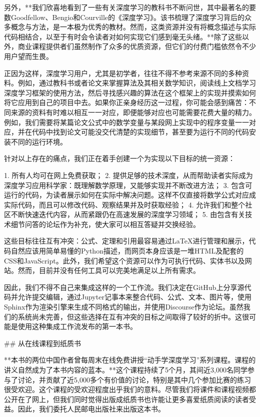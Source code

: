 另外，**我们欣喜地看到了一些有关深度学习的教科书不断问世，其中最著名的要数Goodfellow、Bengio和Courville的《深度学习》。该书梳理了深度学习背后的众多概念与方法，是一本极为优秀的教材。然而，这类资源并没有将概念描述与实际代码相结合，以至于有时会令读者对如何实现它们感到毫无头绪。**除了这些以外，商业课程提供者们虽然制作了众多的优质资源，但它们的付费门槛依然令不少用户望而生畏。

正因为这样，深度学习用户，尤其是初学者，往往不得不参考来源不同的多种资料。例如，通过教科书或者论文来掌握算法及其相关数学知识，阅读线上文档学习深度学习框架的使用方法，然后寻找感兴趣的算法在这个框架上的实现并摸索如何将它应用到自己的项目中去。如果你正亲身经历这一过程，你可能会感到痛苦：不同来源的资料有时难以相互一一对应，即便能够对应也可能需要花费大量的精力。例如，我们需要将某篇论文公式中的数学变量与某段网上实现中的程序变量一一对应，并在代码中找到论文可能没交代清楚的实现细节，甚至要为运行不同的代码安装不同的运行环境。

针对以上存在的痛点，我们正在着手创建一个为实现以下目标的统一资源：

1. 所有人均可在网上免费获取；
2. 提供足够的技术深度，从而帮助读者实际成为深度学习应用科学家：既理解数学原理，又能够实现并不断改进方法；
3. 包含可运行的代码，为读者展示如何在实际中解决问题。这样不仅直接将数学公式对应成实际代码，而且可以修改代码、观察结果并及时获取经验；
4. 允许我们和整个社区不断快速迭代内容，从而紧跟仍在高速发展的深度学习领域；
5. 由包含有关技术细节问答的论坛作为补充，使大家可以相互答疑并交换经验。

这些目标往往互有冲突：公式、定理和引用最容易通过LaTeX进行管理和展示，代码自然应该用简单易懂的Python描述，而网页本身应该是一堆HTML及配套的CSS和JavaScript。此外，我们希望这个资源可以作为可执行代码、实体书以及网站。然而，目前并没有任何工具可以完美地满足以上所有需求。

因此，我们不得不自己来集成这样的一个工作流。我们决定在GitHub上分享源代码并允许提交编辑，通过Jupyter记事本来整合代码、公式、文本、图片等，使用Sphinx作为渲染引擎来生成不同格式的输出，并使用Discourse作为论坛。虽然我们的系统尚未完善，但这些选择在互有冲突的目标之间取得了较好的折中。这很可能是使用这种集成工作流发布的第一本书。

## 从在线课程到纸质书

**本书的两位中国作者曾每周末在线免费讲授“动手学深度学习”系列课程。课程的讲义自然成为了本书内容的蓝本。**这个课程持续了5个月，其间近3,000名同学参与了讨论，并贡献了近5,000多个有价值的讨论，特别是其中几个参加比赛的练习很受欢迎。这个课程的受欢迎程度出乎我们的意料。尽管我们将课件和课程视频都公开在了网上，但我们同时觉得出版成纸质书也许能让更多喜爱纸质阅读的读者受益。因此，我们委托人民邮电出版社来出版这本书。

